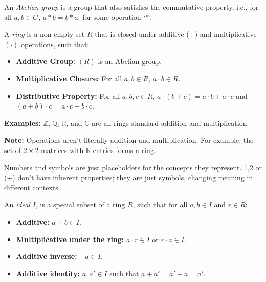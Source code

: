 \begin{Def}

    An \textit{Abelian group} is a group that also satisfies the commutative property, i.e., for all $a,b\in G$, $a*b=b*a$.
    for some operation `$*$'.

\end{Def}

\begin{Def}[Ring]

    A \textit{ring} is a non-empty set $R$ that is closed under additive (+) and multiplicative $(\cdot)$ operations, such that:
    \begin{itemize}
        \item \textbf{Additive Group:} $(R)$ is an Abelian group.
        \item \textbf{Multiplicative Closure:} For all $a,b\in R$, $a\cdot b\in R$.
        \item \textbf{Distributive Property:} For all $a,b,c\in R$, $a\cdot(b+c)=a\cdot b+a\cdot c$ and $(a+b)\cdot c=a\cdot c+b\cdot c$.
    \end{itemize}
\end{Def}

\noindent
\textbf{Examples:} $\mathbb{Z}$, $\mathbb{Q}$, $\mathbb{R}$, and $\mathbb{C}$ are all rings standard addition and multiplication.\\

\begin{Note}
    \textbf{Note:} Operations aren't literally addition and multiplication. For example,
    the set of $2\times2$ matrices with $\mathbb{R}$ entries forms a ring.
\end{Note}
\begin{Tip}
    Numbers and symbols are just placeholders for the concepts they represent.
    1,2 or ($\div$) don't have inherent properties; they are just symbols, changing meaning
    in different contexts.
\end{Tip}

\newpage

\begin{Def}[Ideal]

    An \textit{ideal} $I$, is a special subset of a ring $R$, such that for all $a,b\in I$ and $r\in R$:
    \begin{itemize}
        \item \textbf{Additive:} $a+b\in I$.
        \item \textbf{Multiplicative under the ring:} $a\cdot r\in I$ or $r\cdot a\in I$.
        \item \textbf{Additive inverse:} $-a\in I$.
        \item \textbf{Additive identity:} $a,a'\in I$ such that $a+a'=a'+a=a'$.
    \end{itemize}
\end{Def}

